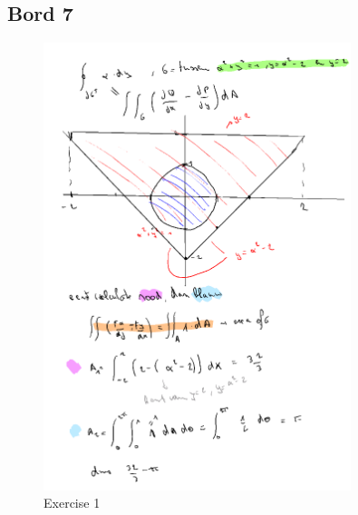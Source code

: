 \documentclass[a4paper]{report}
\begin{document}
\subsection*{Bord 7}


\begin{figure}[H]
	\centering
	\includegraphics[width=0.8\textwidth]{assets/bord_7_ex_1_echt.png}
	\caption{Exercise 1}
	\label{fig:bord_7_ex_1_echt}
\end{figure}
\end{document}
